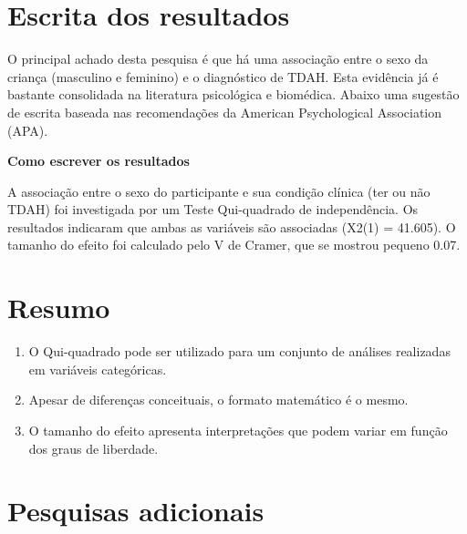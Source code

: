 \documentclass[
]{book}
\providecommand{\tightlist}{%
  \setlength{\itemsep}{0pt}\setlength{\parskip}{0pt}}
\begin{document}
\hypertarget{escrita-dos-resultados}{%
\section{Escrita dos resultados}\label{escrita-dos-resultados}}

O principal achado desta pesquisa é que há uma associação entre o sexo
da criança (masculino e feminino) e o diagnóstico de TDAH. Esta
evidência já é bastante consolidada na literatura psicológica e
biomédica. Abaixo uma sugestão de escrita baseada nas recomendações da
American Psychological Association (APA).

\begin{writing}
\textbf{Como escrever os resultados}

A associação entre o sexo do participante e sua condição clínica (ter ou
não TDAH) foi investigada por um Teste Qui-quadrado de independência. Os
resultados indicaram que ambas as variáveis são associadas (X2(1) =
41.605). O tamanho do efeito foi calculado pelo V de Cramer, que se
mostrou pequeno 0.07.
\end{writing}

\hypertarget{resumo-4}{%
\section{Resumo}\label{resumo-4}}

\begin{explore}

\begin{enumerate}
\def\labelenumi{\arabic{enumi}.}
\tightlist
\item
  O Qui-quadrado pode ser utilizado para um conjunto de análises
  realizadas em variáveis categóricas.\\
\item
  Apesar de diferenças conceituais, o formato matemático é o mesmo.\\
\item
  O tamanho do efeito apresenta interpretações que podem variar em
  função dos graus de liberdade.\\
\end{enumerate}

\end{explore}

\hypertarget{pesquisas-adicionais-1}{%
\section{Pesquisas adicionais}\label{pesquisas-adicionais-1}}
\end{document}
